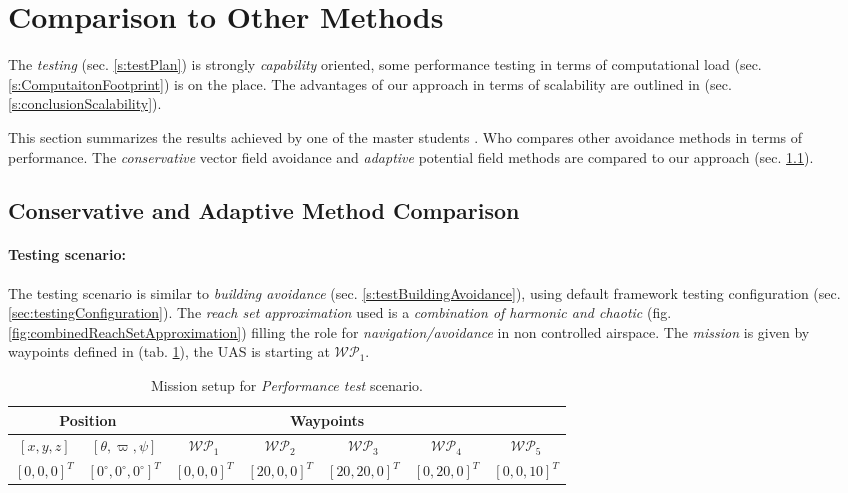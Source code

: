 \setcounter{chapter}{8}
\setcounter{section}{2}
\setcounter{subsection}{0}

\section{Comparison to Other Methods}\label{s:OtherMethodsComparison}
\noindent The \emph{testing} (sec. \ref{s:testPlan}) is strongly \emph{capability} oriented, some performance testing in terms of computational load (sec. \ref{s:ComputaitonFootprint}) is on the place. The advantages of our approach in terms of scalability are outlined in (sec. \ref{s:conclusionScalability}).

This section summarizes the results achieved by one of the master students \cite{hrdlik2018}. Who compares other avoidance methods in terms of performance. The  \emph{conservative }vector field avoidance \cite{borenstein1991vector} and \emph{adaptive} potential field \cite{koren1991potential} methods are compared to our approach (sec. \ref{s:conservativeComparison}).

\subsection{Conservative and Adaptive Method Comparison}\label{s:conservativeComparison}
\paragraph{Testing scenario:} The testing scenario is similar to \emph{building avoidance} (sec. \ref{s:testBuildingAvoidance}), using default framework testing configuration (sec. \ref{sec:testingConfiguration}). The \emph{reach set approximation} used is a \emph{combination of harmonic and chaotic} (fig. \ref{fig:combinedReachSetApproximation}) filling the role for \emph{navigation/avoidance} in non controlled airspace. The \emph{mission} is given by waypoints defined in (tab. \ref{tab:missionSetupForPErformanceTest}), the UAS is starting at $\mathscr{WP}_1$.

\begin{table}[H]
	\centering
	\begin{tabular}{c|c||c|c|c|c|c}
		\multicolumn{2}{c||}{Position} & \multicolumn{4}{c}{Waypoints} \\\hline
		$[x,y,z]$     & $[\theta,\varpi,\psi]$           & $\mathscr{WP}_1$   & $\mathscr{WP}_2$   & $\mathscr{WP}_3$   & $\mathscr{WP}_4$    & $\mathscr{WP}_5$\\\hline\hline
		$[0,0,0]^T $       & $[0^\circ,0^\circ,0^\circ]^T$ & $[0,0,0]^T$ & $[20,0,0]^T$       & $[20,20,0]^T$       & $[0,20,0]^T$       & $[0,0,10]^T$       
	\end{tabular}
	\caption{Mission setup for \emph{Performance test} scenario.}
	\label{tab:missionSetupForPErformanceTest}
\end{table}

